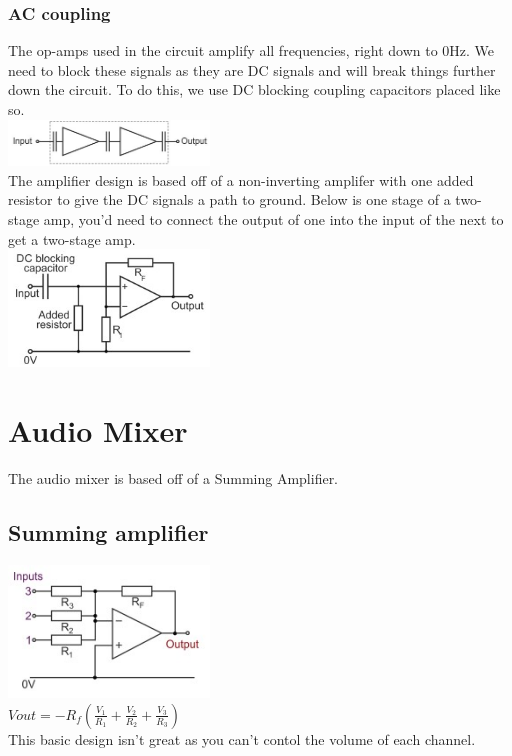 \documentclass[a4paper, 11pt, twocolumn]{article}
\begin{document}
    \subsubsection{AC coupling}
    The op-amps used in the circuit amplify all frequencies, right down to 0Hz. We need to block these signals as they are DC signals and will break things further down the circuit. To do this, we use DC blocking coupling capacitors placed like so. \\
    \includegraphics[width=0.4\textwidth]{dcBlock.jpg} \\
    The amplifier design is based off of a non-inverting amplifer with one added resistor to give the DC signals a path to ground. Below is one stage of a two-stage amp, you'd need to connect the output of one into the input of the next to get a two-stage amp. \\
    \includegraphics[width=0.4\textwidth]{singleStageAmp.jpg} \\

    \section{Audio Mixer}
    The audio mixer is based off of a Summing Amplifier.
    \subsection{Summing amplifier}
    \includegraphics[width=0.4\textwidth]{summingAmp.jpg} \\
    $Vout = -R_f(\frac{V_1}{R_1} + \frac{V_2}{R_2} + \frac{V_3}{R_3})$ \\
    This basic design isn't great as you can't contol the volume of each channel.
\end{document}
